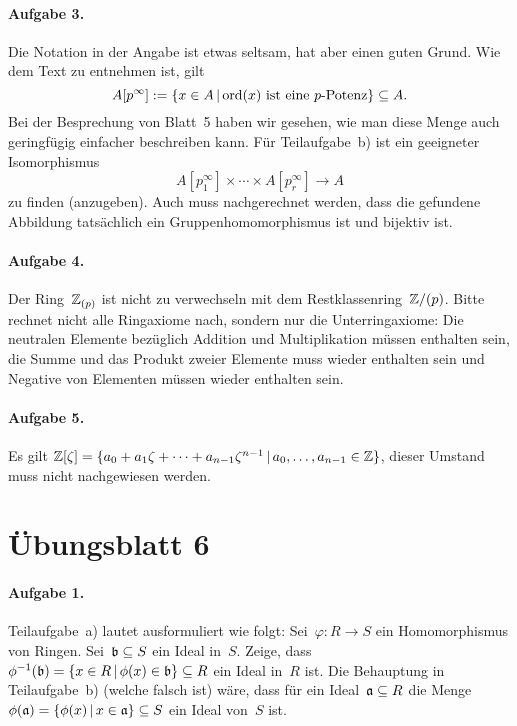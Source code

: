 \documentclass{algblatt}
\newcommand{\hint}[1]{\rotatebox{180}{\vbox{\textcolor{grey}{#1}}}}
\begin{document}
\paragraph{Aufgabe 3.} Die Notation in der Angabe ist etwas seltsam, hat aber
einen guten Grund. Wie dem Text zu entnehmen ist, gilt
\[ A[p^\infty] := \{ x \in A \,|\, \text{$\ord(x)$ ist eine~$p$-Potenz} \}
\subseteq A. \]
Bei der Besprechung von Blatt~5 haben wir gesehen, wie man diese Menge auch
geringfügig einfacher beschreiben kann. Für Teilaufgabe~b) ist ein geeigneter
Isomorphismus
\[ A[p_1^\infty] \times \cdots \times A[p_r^\infty] \longrightarrow A \]
zu finden (anzugeben). Auch muss nachgerechnet werden, dass die gefundene
Abbildung tatsächlich ein Gruppenhomomorphismus ist und bijektiv ist.

\paragraph{Aufgabe 4.} Der Ring~$\ZZ_{(p)}$ ist nicht zu verwechseln mit dem
Restklassenring~$\ZZ/(p)$. Bitte rechnet nicht alle Ringaxiome nach, sondern
nur die Unterringaxiome: Die neutralen Elemente bezüglich Addition und
Multiplikation müssen enthalten sein, die Summe und das Produkt zweier Elemente
muss wieder enthalten sein und Negative von Elementen müssen wieder enthalten sein.

\paragraph{Aufgabe 5.} Es gilt $\ZZ[\zeta] = \{ a_0 + a_1 \zeta + \cdots +
a_{n-1} \zeta^{n-1} \,|\, a_0,\ldots,a_{n-1} \in \ZZ \}$, dieser Umstand muss
nicht nachgewiesen werden.

\hint{Zu Teilaufgabe~b): Die Techniken des üblichen Beweises, dass~$\O_\QQ =
\ZZ$, lassen sich auf diesen Fall übertragen. Ein genauerer Hinweis wird noch
folgen.}


\section*{Übungsblatt 6}

\paragraph{Aufgabe 1.}
Teilaufgabe~a) lautet ausformuliert wie folgt:
Sei~$\varphi : R \to S$ ein Homomorphismus von Ringen. Sei~$\bb \subseteq
S$ ein Ideal in~$S$. Zeige, dass~$\phi^{-1}(\bb) = \{ x \in R \,|\, \phi(x) \in
\bb \} \subseteq R$ ein Ideal in~$R$ ist.
Die Behauptung in Teilaufgabe~b) (welche falsch ist) wäre, dass für ein
Ideal~$\aa \subseteq R$ die Menge~$\phi(\aa) = \{ \phi(x) \,|\, x \in \aa \}
\subseteq S$ ein Ideal von~$S$ ist.
\end{document}
